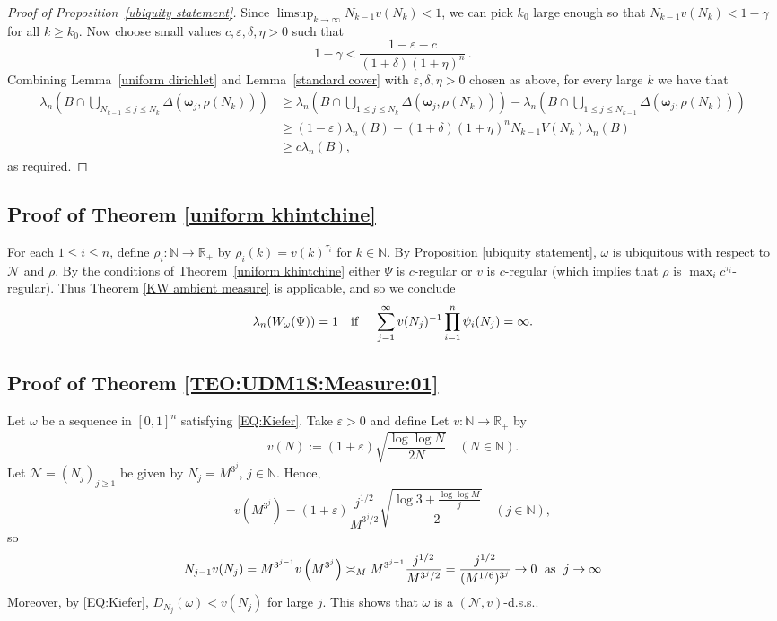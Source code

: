 \documentclass{amsart}
\theoremstyle{definition}
\newcommand{\N}{\mathbb N}%
\newcommand{\R}{\mathbb R}
\newcommand{\0}{\mbf 0}%
\newcommand{\cN}{{\mathcal N}}
\renewcommand{\text}{\textup}
\def\N{\mathbb N}
\def\R{\mathbb R}
\begin{document}
\begin{proof}[Proof of Proposition~\ref{ubiquity statement}]
Since $\limsup_{k\to\infty} N_{k-1}v(N_{k})<1$, we can pick $k_{0}$ large enough so that $N_{k-1}v(N_{k})<1-\gamma$ for all $k\geq k_{0}$. Now choose small values $c,\varepsilon,\delta,\eta>0$ such that
\begin{equation*}
    1-\gamma < \frac{1-\varepsilon-c}{(1+\delta)(1+\eta)^{n}}\, .
\end{equation*}
 Combining Lemma~\ref{uniform dirichlet} and Lemma~\ref{standard cover} with $\varepsilon, \delta,\eta>0$ chosen as above, for every large $k$ we have that
\begin{align*}
    \lambda_n\left( B \cap \bigcup_{N_{k-1}\leq j \leq N_{k}}\Delta\left( \boldsymbol{\omega}_{j},\rho(N_{k})\right)\right) &\geq \lambda_n\left( B \cap \bigcup_{1\leq j \leq N_{k}}\Delta\left( \boldsymbol{\omega}_{j},\rho(N_{k})\right)\right)-\lambda_n\left( B \cap \bigcup_{1\leq j \leq N_{k-1}}\Delta\left( \boldsymbol{\omega}_{j},\rho(N_{k})\right)\right) \\
    &\geq (1-\varepsilon)\lambda_n(B)-(1+\delta)(1+\eta)^{n}N_{k-1}V(N_{k})\lambda_n(B)\\
    &\geq c\lambda_n(B),
\end{align*}
as required.
\end{proof}
\subsection{Proof of Theorem \ref{uniform khintchine}}
For each $1\leq i \leq n$, define $\rho_i:\N\to\R_{+}$ by $\rho_i(k)=v(k)^{\tau_i}$ for $k\in\N$.
By Proposition \ref{ubiquity statement}, $\omega$ is ubiquitous with respect to $\cN$ and $\rho$. 
By the conditions of Theorem~\ref{uniform khintchine} either $\Psi$ is $c$-regular or $v$ is $c$-regular (which implies that $\rho$ is $\max_{i} c^{\tau_{i}}$-regular).
Thus Theorem \ref{KW ambient measure} is applicable, and so we conclude
\begin{equation*}
    \lambda_n(W_{\omega}(\Psi))=1 \quad \text{\rm if }\quad \sum_{j=1}^{\infty} v(N_{j})^{-1}\prod_{i=1}^{n}\psi_{i}(N_{j}) = \infty.
\end{equation*}


\subsection{Proof of Theorem \ref{TEO:UDM1S:Measure:01}}


Let $\omega$ be a sequence in $[0,1]^n$ satisfying \eqref{EQ:Kiefer}. Take $\varepsilon>0$ and define Let $v:\N\to\R_{+}$ by
\[
v(N)
:=
(1+\varepsilon)
\sqrt{\frac{\log \log N}{2N}}
\quad (N\in\N).
\]
Let $\mathcal{N}=(N_j)_{j\geq 1}$ be given by $N_j=M^{3^j}$, $j\in\N$.
Hence,
\[
v\left( M^{3^j}\right) 
=
(1+\varepsilon)
\frac{j^{1/2}}{M^{3^j/2}}  \sqrt{\frac{\log 3 +\frac{\log\log M}{j}}{ 2 } }
\quad (j\in\N),
\]
so
\[
N_{j-1}v(N_j)
=
M^{3^{j-1}}v\left(M^{3^j}\right) 
\asymp_M 
M^{3^{j-1}} \frac{j^{1/2}}{M^{3^j/2}} 
= 
\frac{j^{1/2}}{(M^{1/6})^{3^j}}  \to 0 \;\text{ as }\; j\to\infty
\]
Moreover, by \eqref{EQ:Kiefer}, $D_{N_j}(\omega)< v(N_j)$ for large $j$.
This shows that $\omega$ is a $(\mathcal{N}, v)$-d.s.s..
\end{document}
